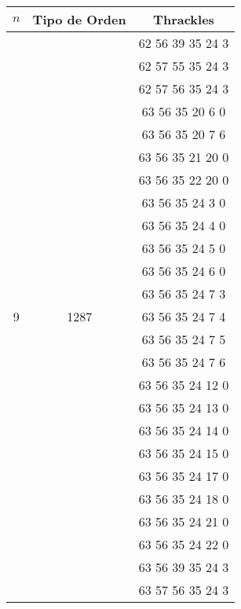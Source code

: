   \begin{tabular}[t]{|c|c|c|}
    \hline
    $n$                 &Tipo de Orden        & Thrackles         \\ \hline\hline
    \multirow{25}{*}{9} &\multirow{25}{*}{1287}& 62 56 39 35 24 3      \\ \cline{3-3}
                        &                     & 62 57 55 35 24 3      \\ \cline{3-3}
                        &                     & 62 57 56 35 24 3      \\ \cline{3-3}
                        &                     & 63 56 35 20 6 0      \\ \cline{3-3}
                        &                     & 63 56 35 20 7 6     \\ \cline{3-3}
                        &                     & 63 56 35 21 20 0      \\ \cline{3-3}
                        &                     & 63 56 35 22 20 0      \\ \cline{3-3}
                        &                     & 63 56 35 24 3 0     \\ \cline{3-3}
                        &                     & 63 56 35 24 4 0     \\ \cline{3-3}
                        &                     & 63 56 35 24 5 0     \\ \cline{3-3}
                        &                     & 63 56 35 24 6 0     \\ \cline{3-3}
                        &                     & 63 56 35 24 7 3     \\ \cline{3-3}
                        &                     & 63 56 35 24 7 4     \\ \cline{3-3}
                        &                     & 63 56 35 24 7 5     \\ \cline{3-3}
                        &                     & 63 56 35 24 7 6     \\ \cline{3-3}
                        &                     & 63 56 35 24 12 0      \\ \cline{3-3}
                        &                     & 63 56 35 24 13 0      \\ \cline{3-3}
                        &                     & 63 56 35 24 14 0      \\ \cline{3-3}
                        &                     & 63 56 35 24 15 0      \\ \cline{3-3}
                        &                     & 63 56 35 24 17 0      \\ \cline{3-3}
                        &                     & 63 56 35 24 18 0      \\ \cline{3-3}
                        &                     & 63 56 35 24 21 0      \\ \cline{3-3}
                        &                     & 63 56 35 24 22 0      \\ \cline{3-3}
                        &                     & 63 56 39 35 24 3      \\ \cline{3-3}
                        &                     & 63 57 56 35 24 3      \\ \hline


\end{tabular}
